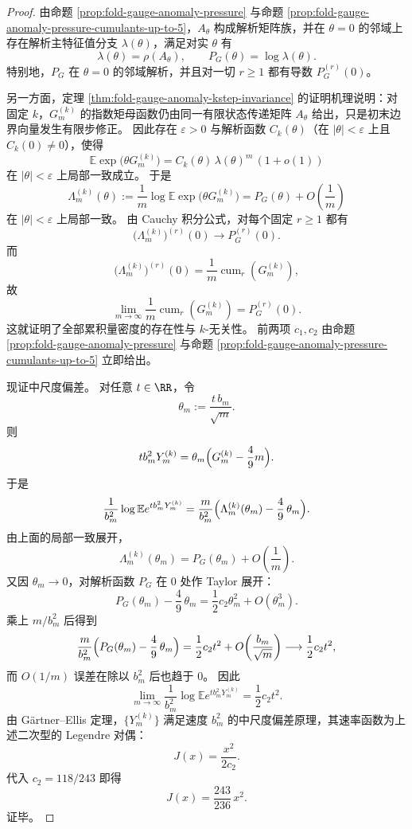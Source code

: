 \begin{proof}
由命题 \ref{prop:fold-gauge-anomaly-pressure} 与命题 \ref{prop:fold-gauge-anomaly-pressure-cumulants-up-to-5}，\(A_\theta\) 构成解析矩阵族，并在 \(\theta=0\) 的邻域上存在解析主特征值分支 \(\lambda(\theta)\)，满足对实 \(\theta\) 有
\[
\lambda(\theta)=\rho(A_\theta),
\qquad
P_G(\theta)=\log \lambda(\theta).
\]
特别地，\(P_G\) 在 \(\theta=0\) 的邻域解析，并且对一切 \(r\ge 1\) 都有导数 \(P_G^{(r)}(0)\)。

另一方面，定理 \ref{thm:fold-gauge-anomaly-kstep-invariance} 的证明机理说明：对固定 \(k\)，\(G_m^{(k)}\) 的指数矩母函数仍由同一有限状态传递矩阵 \(A_\theta\) 给出，只是初末边界向量发生有限步修正。
因此存在 \(\varepsilon>0\) 与解析函数 \(C_k(\theta)\)（在 \(|\theta|<\varepsilon\) 上且 \(C_k(0)\neq 0\)），使得
\[
\mathbb E\exp\!\bigl(\theta G_m^{(k)}\bigr)
=
C_k(\theta)\,\lambda(\theta)^m\,(1+o(1))
\]
在 \(|\theta|<\varepsilon\) 上局部一致成立。
于是
\[
\Lambda_m^{(k)}(\theta)
:=
\frac{1}{m}\log \mathbb E\exp\!\bigl(\theta G_m^{(k)}\bigr)
=
P_G(\theta)+O\!\left(\frac{1}{m}\right)
\]
在 \(|\theta|<\varepsilon\) 上局部一致。
由 Cauchy 积分公式，对每个固定 \(r\ge 1\) 都有
\[
\bigl(\Lambda_m^{(k)}\bigr)^{(r)}(0)\longrightarrow P_G^{(r)}(0).
\]
而
\[
\bigl(\Lambda_m^{(k)}\bigr)^{(r)}(0)
=
\frac{1}{m}\operatorname{cum}_r(G_m^{(k)}),
\]
故
\[
\lim_{m\to\infty}\frac{1}{m}\operatorname{cum}_r(G_m^{(k)})
=
P_G^{(r)}(0).
\]
这就证明了全部累积量密度的存在性与 \(k\)-无关性。
前两项 \(c_1,c_2\) 由命题 \ref{prop:fold-gauge-anomaly-pressure} 与命题 \ref{prop:fold-gauge-anomaly-pressure-cumulants-up-to-5} 立即给出。

现证中尺度偏差。
对任意 \(t\in\RR\)，令
\[
\theta_m:=\frac{t\,b_m}{\sqrt m}.
\]
则
\[
t b_m^2 Y_m^{(k)}
=
\theta_m\Bigl(G_m^{(k)}-\frac49 m\Bigr).
\]
于是
\[
\frac{1}{b_m^2}\log \mathbb E e^{t b_m^2 Y_m^{(k)}}
=
\frac{m}{b_m^2}\Bigl(\Lambda_m^{(k)}(\theta_m)-\frac49\,\theta_m\Bigr).
\]
由上面的局部一致展开，
\[
\Lambda_m^{(k)}(\theta_m)=P_G(\theta_m)+O\!\left(\frac{1}{m}\right).
\]
又因 \(\theta_m\to 0\)，对解析函数 \(P_G\) 在 \(0\) 处作 Taylor 展开：
\[
P_G(\theta_m)-\frac49\,\theta_m
=
\frac12 c_2\theta_m^2+O(\theta_m^3).
\]
乘上 \(m/b_m^2\) 后得到
\[
\frac{m}{b_m^2}\Bigl(P_G(\theta_m)-\frac49\,\theta_m\Bigr)
=
\frac12 c_2 t^2
+ O\!\left(\frac{b_m}{\sqrt m}\right)
\longrightarrow
\frac12 c_2 t^2,
\]
而 \(O(1/m)\) 误差在除以 \(b_m^2\) 后也趋于 \(0\)。
因此
\[
\lim_{m\to\infty}\frac{1}{b_m^2}\log \mathbb E e^{t b_m^2 Y_m^{(k)}}
=
\frac12 c_2 t^2.
\]
由 G\"artner--Ellis 定理，\(\{Y_m^{(k)}\}\) 满足速度 \(b_m^2\) 的中尺度偏差原理，其速率函数为上述二次型的 Legendre 对偶：
\[
J(x)=\frac{x^2}{2c_2}.
\]
代入 \(c_2=118/243\) 即得
\[
J(x)=\frac{243}{236}\,x^2.
\]
证毕。
\end{proof}


